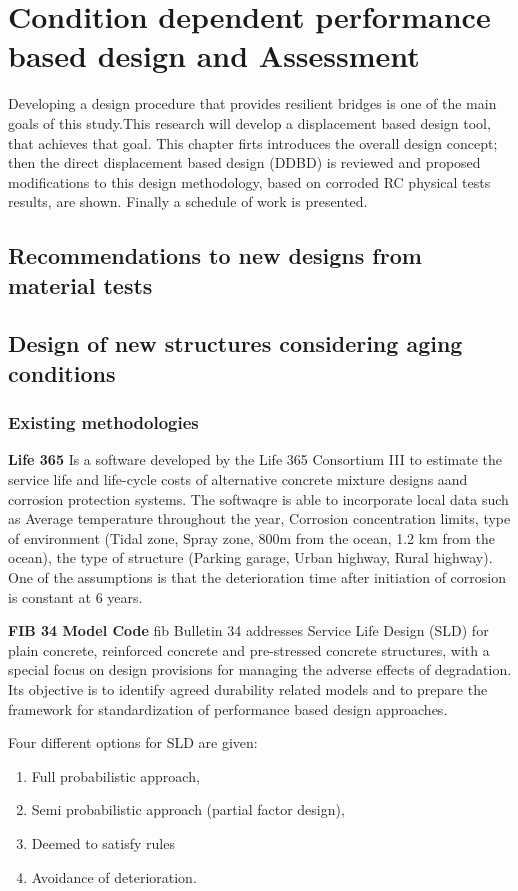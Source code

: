 \chapter{Condition dependent performance based design and Assessment}

\label{chap-five}

Developing a design procedure that provides resilient bridges is one of the main goals of this study.This research will develop a displacement based design tool, that achieves that goal. This chapter firts introduces the overall design concept; then the direct displacement based design (DDBD) is reviewed and proposed modifications to this design methodology, based on corroded RC physical tests results, are shown. Finally a schedule of work is presented.

\section{Recommendations to new designs from material tests}
\section{Design of new structures considering aging conditions}
\subsection{Existing methodologies}

\textbf{Life 365}
Is a software developed by the Life 365 Consortium III to estimate the service life and life-cycle costs of alternative concrete mixture designs aand corrosion protection systems. The softwaqre is able to incorporate local data such as Average temperature throughout the year, Corrosion concentration limits, type of environment (Tidal zone, Spray zone, 800m from the ocean, 1.2 km from the ocean), the type of structure (Parking garage, Urban highway, Rural highway). One of the assumptions is that the deterioration time after initiation of corrosion is constant at 6 years.

\textbf{FIB 34 Model Code}
fib Bulletin 34 addresses Service Life Design (SLD) for plain concrete, reinforced concrete and pre-stressed concrete structures, with a special focus on design provisions for managing the adverse effects of degradation. Its objective is to identify agreed durability related models and to prepare the framework for standardization of performance based design approaches.

Four different options for SLD are given:
\begin{enumerate}
    \item Full probabilistic approach,
    \item Semi probabilistic approach (partial factor design),
    \item Deemed to satisfy rules
    \item Avoidance of deterioration.
\end{enumerate}




